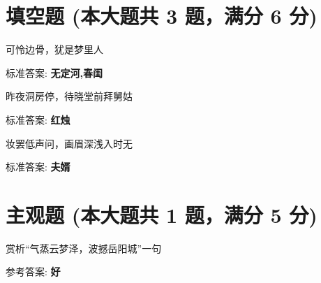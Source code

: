 \documentclass[12pt, a4paper, addpoints]{exam}
\begin{document}
\hspace{5cm}

\section{\normalsize{填空题 (本大题共 3 题，满分 6 分)}}
\hspace{1.5cm}

\begin{questions}
\question[2] 可怜\uline{\qquad\qquad\qquad}边骨，犹是\uline{\qquad\qquad\qquad}梦里人

标准答案: \textbf{无定河,春闺}

\question[2] 昨夜洞房停\uline{\qquad\qquad\qquad}，待晓堂前拜舅姑

标准答案: \textbf{红烛}

\question[2] 妆罢低声问\uline{\qquad\qquad\qquad}，画眉深浅入时无

标准答案: \textbf{夫婿}

\end{questions}

\hspace{5cm}

\section{\normalsize{主观题 (本大题共 1 题，满分 5 分)}}
\hspace{1.5cm}

\begin{questions}
\question[5] 赏析“气蒸云梦泽，波撼岳阳城”一句


参考答案: \textbf{好}

\end{questions}
\end{document}
